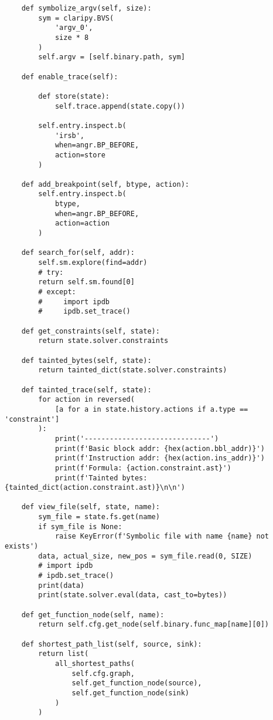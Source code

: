 \documentclass[a4paper,12pt]{report}
\begin{document}
\begin{lstlisting}
    def symbolize_argv(self, size):
        sym = claripy.BVS(
            'argv_0',
            size * 8
        )
        self.argv = [self.binary.path, sym]

    def enable_trace(self):

        def store(state):
            self.trace.append(state.copy())

        self.entry.inspect.b(
            'irsb',
            when=angr.BP_BEFORE,
            action=store
        )

    def add_breakpoint(self, btype, action):
        self.entry.inspect.b(
            btype,
            when=angr.BP_BEFORE,
            action=action
        )

    def search_for(self, addr):
        self.sm.explore(find=addr)
        # try:
        return self.sm.found[0]
        # except:
        #     import ipdb
        #     ipdb.set_trace()

    def get_constraints(self, state):
        return state.solver.constraints

    def tainted_bytes(self, state):
        return tainted_dict(state.solver.constraints)

    def tainted_trace(self, state):
        for action in reversed(
            [a for a in state.history.actions if a.type == 'constraint']
        ):
            print('------------------------------')
            print(f'Basic block addr: {hex(action.bbl_addr)}')
            print(f'Instruction addr: {hex(action.ins_addr)}')
            print(f'Formula: {action.constraint.ast}')
            print(f'Tainted bytes: {tainted_dict(action.constraint.ast)}\n\n')

    def view_file(self, state, name):
        sym_file = state.fs.get(name)
        if sym_file is None:
            raise KeyError(f'Symbolic file with name {name} not exists')
        data, actual_size, new_pos = sym_file.read(0, SIZE)
        # import ipdb
        # ipdb.set_trace()
        print(data)
        print(state.solver.eval(data, cast_to=bytes))

    def get_function_node(self, name):
        return self.cfg.get_node(self.binary.func_map[name][0])

    def shortest_path_list(self, source, sink):
        return list(
            all_shortest_paths(
                self.cfg.graph,
                self.get_function_node(source),
                self.get_function_node(sink)
            )
        )




\end{lstlisting}
\end{document}

